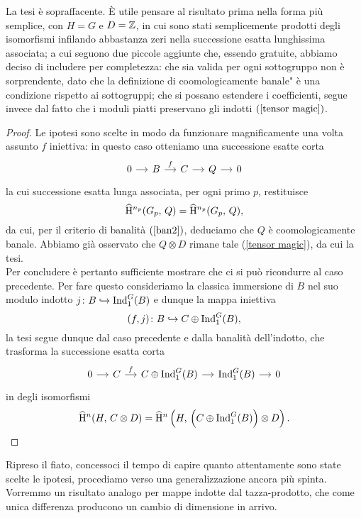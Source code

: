 La tesi è sopraffacente. È utile pensare al risultato prima nella forma più semplice, con $ H=G $ e $ D = \mathbb{Z} $, in cui sono stati semplicemente prodotti degli isomorfismi infilando abbastanza zeri nella successione esatta lunghissima associata; a cui seguono due piccole aggiunte che, essendo gratuite, abbiamo deciso di includere per completezza: che sia valida per ogni sottogruppo non è sorprendente, dato che la definizione di \leftquote coomologicamente banale" è una condizione rispetto ai sottogruppi; che si possano estendere i coefficienti, segue invece dal fatto che i moduli piatti preservano gli indotti $ (\ref{tensor magic}) $. 

\begin{proof}
	Le ipotesi sono scelte in modo da funzionare magnificamente una volta assunto $ f $ iniettiva: in questo caso otteniamo una successione esatte corta
	\[ \begin{tikzcd}[column sep = small]
	0 \rar
	& B \rar["f"]
	& C \rar
	& Q \rar
	& 0 \end{tikzcd} \]
	la cui successione esatta lunga associata, per ogni primo $ p $, restituisce
	\[ \operatorname{\widehat{H}^{\mathnormal{n_p}}}(G_p, \, Q) = \operatorname{\widehat{H}^{\mathnormal{n_p}}}(G_p, \, Q), \]
	da cui, per il criterio di banalità $ (\ref{ban2}) $, deduciamo che $ Q $ è coomologicamente banale. Abbiamo già osservato che $ Q \otimes D $ rimane tale (\ref{tensor magic}), da cui la tesi. \\
	
	Per concludere è pertanto sufficiente mostrare che  ci si può ricondurre al caso precedente. Per fare questo consideriamo la classica immersione di $ B $ nel suo modulo indotto $ j \colon B \hookrightarrow \operatorname{Ind}_1^G(B) $ e dunque la mappa iniettiva
	\[ (f, j)\colon B \hookrightarrow C \oplus \operatorname{Ind}_1^G(B), \]
	la tesi segue dunque dal caso precedente e dalla banalità dell'indotto, che trasforma la successione esatta corta
	\[ \begin{tikzcd}[column sep = small]
	0 \rar
	& C \rar["f"]
	& C \oplus \Ind_1^G(B) \rar
	& \Ind_1^G(B) \rar
	& 0 \end{tikzcd} \]
	in degli isomorfismi
	\[ \operatorname{\widehat{H}^{\mathnormal{n}}}(H, \, C \otimes D ) = \operatorname{\widehat{H}^{\mathnormal{n}}} \left(H, \, \left(C \oplus \operatorname{Ind}_1^G(B)\right) \otimes D \right).  \qedhere \]
\end{proof}

Ripreso il fiato, concessoci il tempo di capire quanto attentamente sono state scelte le ipotesi, procediamo verso una generalizzazione ancora più spinta. Vorremmo un risultato analogo per mappe indotte dal tazza-prodotto, che come unica differenza producono un cambio di dimensione in arrivo.

